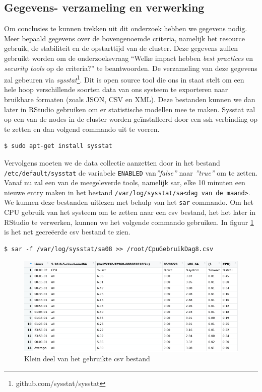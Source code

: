 \subsection{Gegevens- verzameling en verwerking} \label{ch:gegevens}
Om conclusies te kunnen trekken uit dit onderzoek hebben we gegevens nodig. Meer bepaald gegevens over de bovengenoemde criteria, namelijk het resource gebruik, de stabiliteit en de opstarttijd van de cluster. Deze gegevens zullen gebruikt worden om de onderzoeksvraag ``Welke impact hebben \textit{best practices} en \textit{security tools} op de criteria?'' te beantwoorden. De verzameling van deze gegevens zal gebeuren via \textit{sysstat}\footnote{github.com/sysstat/sysstat}. Dit is open source tool die ons in staat stelt om een hele hoop verschillende soorten data van ons systeem te exporteren naar bruikbare formaten (zoals JSON, CSV en XML). Deze bestanden kunnen we dan later in RStudio gebruiken om er statistische modellen mee te maken. Sysstat zal op een van de nodes in de cluster worden geïnstalleerd door een ssh verbinding op te zetten en dan volgend commando uit te voeren.
\begin{verbatim} 
$ sudo apt-get install sysstat
\end{verbatim}

Vervolgens moeten we de data collectie aanzetten door in het bestand \verb|/etc/default/sysstat| de variabele \verb|ENABLED| van\textit{''false''} naar \textit{''true''} om te zetten. Vanaf nu zal een van de meegeleverde tools, namelijk sar, elke 10 minuten een nieuwe entry maken in het bestand \verb|/var/log/sysstat/sa<dag van de maand>|. We kunnen deze bestanden uitlezen met behulp van het \verb|sar| commando. Om het CPU gebruik van het systeem om te zetten naar een csv bestand, het het later in RStudio te verwerken, kunnen we het volgende commando gebruiken. In figuur \ref{fig:CPUDataPreview} is het net gecreëerde csv bestand te zien.

\begin{verbatim} 
$ sar -f /var/log/sysstat/sa08 >> /root/CpuGebruikDag8.csv
\end{verbatim}

\begin{figure}[h]
	\centering
	\includegraphics[width=\linewidth]{img/CPUDataPreview.png}
	\caption{Klein deel van het gebruikte csv bestand}
	\label{fig:CPUDataPreview}
\end{figure}

